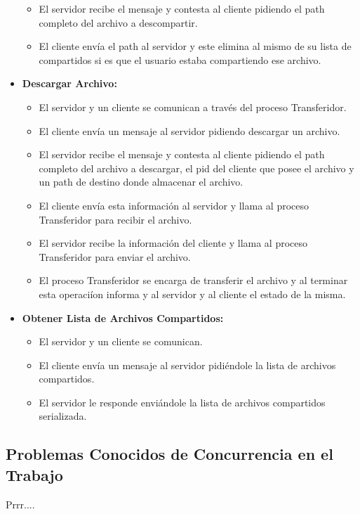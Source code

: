 \documentclass[a4paper,10pt]{article}
\begin{document}
\begin{itemize}
\begin{itemize}
						\item El servidor recibe el mensaje y contesta al cliente pidiendo el path completo del
								archivo a descompartir.
						\item El cliente env\'ia el path al servidor y este elimina al mismo de su lista de compartidos
								si es que el usuario estaba compartiendo ese archivo.
					\end{itemize}
				\item \textbf{Descargar Archivo:}
					\begin{itemize}
						\item El servidor y un cliente se comunican a trav\'es del proceso Transferidor.
						\item El cliente env\'ia un mensaje al servidor pidiendo descargar un archivo.
						\item El servidor recibe el mensaje y contesta al cliente pidiendo el path completo del 
									archivo a descargar, el pid del cliente que posee el archivo y un path de destino
									donde almacenar el archivo.
						\item El cliente env\'ia esta informaci\'on al servidor y llama al proceso Transferidor para
									recibir el archivo.
						\item El servidor recibe la informaci\'on del cliente y llama al proceso Transferidor para
									enviar el archivo.
						\item El proceso Transferidor se encarga de transferir el archivo y al terminar esta operaci\'ion 
									informa y al servidor y al cliente el estado de la misma.
					\end{itemize}
				
				\item \textbf{Obtener Lista de Archivos Compartidos:}
					\begin{itemize}
						\item El servidor y un cliente se comunican.
						\item El cliente env\'ia un mensaje al servidor pidi\'endole la lista de archivos compartidos.
						\item El servidor le responde envi\'andole la lista de archivos compartidos serializada.
					\end{itemize}
			\end{itemize}

	\subsection{Problemas Conocidos de Concurrencia en el Trabajo}
	Prrr....
\end{document}
